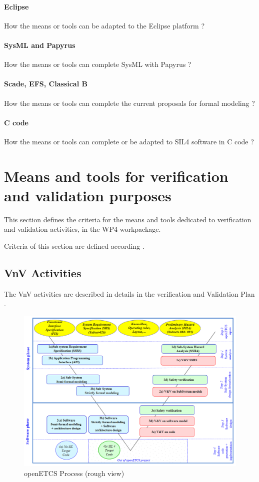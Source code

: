 \paragraph{Eclipse}
How the means or tools can be adapted to the Eclipse platform ?

\paragraph{SysML and Papyrus}
How the means or tools can complete SysML with Papyrus ?


\paragraph{Scade, EFS, Classical B}
How the means or tools can complete the current proposals for formal modeling ?

\paragraph{C code}
How the means or tools can complete or be adapted to SIL4 software in C code ?



\section{Means and tools for verification and validation purposes}
\label{sec:vnv}

This section defines the criteria for the means and tools dedicated to verification and validation activities, in the WP4 workpackage. 

Criteria of this section are defined according \citep{D4.1}.

\subsection{VnV Activities}

The VnV activities are described in details in the verification and Validation Plan  \citep{D4.1}.

\begin{figure}[htb]
  \centering
  \includegraphics[width=.9\textwidth]{images/ProcessOpenETCS-BeM.png}
  \caption{openETCS Process (rough view)}
  \label{fig:openETCSProcess}
\end{figure}

